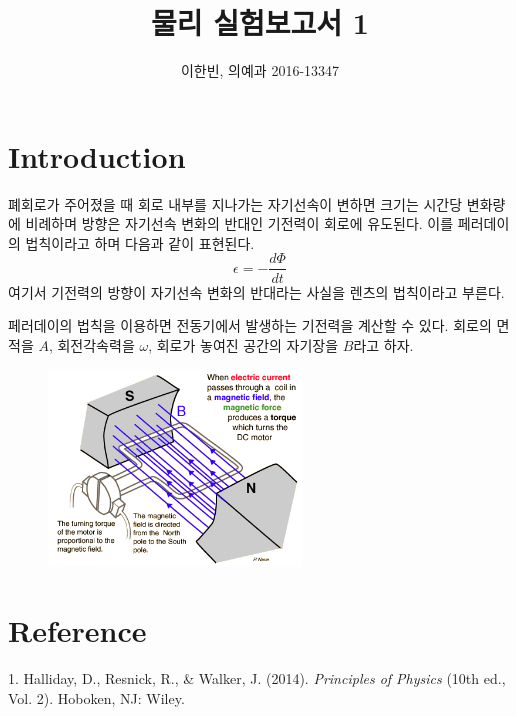 \documentclass[a4paper]{article}
\title{물리 실험보고서 1}
\author{이한빈, 의예과 2016-13347}
\begin{document}
\maketitle

\section{Introduction}
	폐회로가 주어졌을 때 회로 내부를 지나가는 자기선속이 변하면 크기는 시간당 변화량에 비례하며 방향은 자기선속 변화의 반대인 기전력이 회로에 유도된다.
	이를 페러데이의 법칙이라고 하며 다음과 같이 표현된다.
	\begin{equation}
		\epsilon = -\frac{d\Phi}{dt}
	\end{equation}
	여기서 기전력의 방향이 자기선속 변화의 반대라는 사실을 렌츠의 법칙이라고 부른다.

	페러데이의 법칙을 이용하면 전동기에서 발생하는 기전력을 계산할 수 있다.
	회로의 면적을 $A$, 회전각속력을 $\omega$, 회로가 놓여진 공간의 자기장을 $B$라고 하자.
	\begin{figure}[h]
		\centering
		\includegraphics[width=0.6\textwidth]{img/motor.png}
	\end{figure}






\section{Reference}
	1. Halliday, D., Resnick, R., \& Walker, J. (2014). {\it{}Principles of Physics} (10th ed., Vol. 2). Hoboken, NJ: Wiley. 
\end{document}
